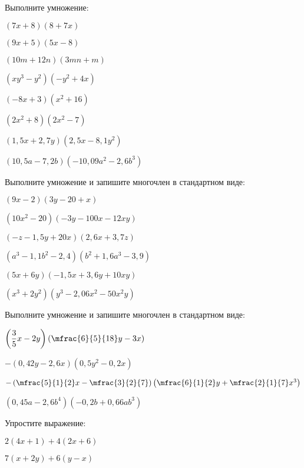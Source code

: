 \begin{class}[number=5]
	\begin{listofex}
		\item Выполните умножение:
		\begin{enumcols}[itemcolumns=2]
			\item \( (7x+8)(8+7x) \)
			\item \( (9x+5)(5x-8) \)
			\item \( (10m+12n)(3mn+m) \)
			\item \( (xy^3-y^2)(-y^2+4x) \)
			\item \( (-8x+3)(x^2+16) \)
			\item \( (2x^2+8)(2x^2-7) \)
			\item \( (1,5x+2,7y)(2,5x-8,1y^2) \)
			\item \( (10,5a-7,2b)(-10,09a^2-2,6b^3) \)
		\end{enumcols}
		\item Выполните умножение и запишите многочлен в стандартном виде:
		\begin{enumcols}[itemcolumns=2]
			\item \( (9x-2)(3y-20+x) \)
			\item \( (10x^2-20)(-3y-100x-12xy) \)
			\item \( (-z-1,5y+20x)(2,6x+3,7z) \)
			\item \( (a^3-1,1b^2-2,4)(b^2+1,6a^3-3,9) \)
			\item \( (5x+6y)(-1,5x+3,6y+10xy) \)
			\item \( (x^3+2y^2)(y^3-2,06x^2-50x^2y) \)
		\end{enumcols}
		\item Выполните умножение и запишите многочлен в стандартном виде:
		\begin{enumcols}[itemcolumns=2]
			\item \( \left( \dfrac{3}{5}x-2y \right)\left( \mfrac{6}{5}{18}y-3x \right) \)
			\item \( -(0,42y-2,6x)(0,5y^2-0,2x) \)
			\item \( -\left( \mfrac{5}{1}{2}x-\mfrac{3}{2}{7} \right)\left( \mfrac{6}{1}{2}y+\mfrac{2}{1}{7}x^3 \right) \)
			\item \( (0,45a-2,6b^4)(-0,2b+0,66ab^3) \)
		\end{enumcols}
		\item Упростите выражение:
		\begin{enumcols}[itemcolumns=2]
			\item \( 2(4x+1)+4(2x+6) \)
			\item \( 7(x+2y)+6(y-x) \)

\end{enumcols}
\end{listofex}
\end{class}
